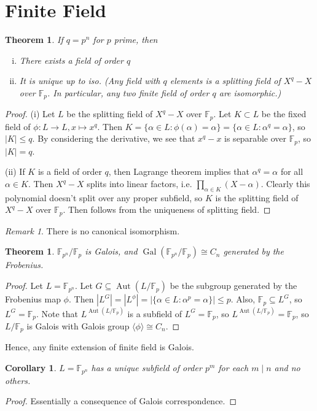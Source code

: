 \documentclass{article}
\theoremstyle{definition}
\theoremstyle{remark}
\newtheorem{rem}{Remark}
\theoremstyle{plain}
\newtheorem{thm}[defn]{Theorem}
\newtheorem{crly}[defn]{Corollary}
\newcommand{\FF}{\mathbb{F}}
\newcommand{\Aut}{\operatorname{Aut}}
\newcommand{\Gal}{\operatorname{Gal}}
\begin{document}
\section{Finite Field}
\begin{thm}
    If $q=p^n$ for $p$ prime, then \begin{enumerate}[(i)]
        \item There exists a field of order $q$
        \item It is unique up to iso. (Any field with $q$ elements is a splitting field of $X^q-X$ over $\FF_p$. In particular, any two finite field of order $q$ are isomorphic.)
    \end{enumerate}
\end{thm}
\begin{proof}
    (i) Let $L$ be the splitting field of $X^q-X$ over $\FF_p$. Let $K\subset L$ be the fixed field of $\phi:L\to L, x\mapsto x^q$. Then $K=\{\alpha\in L:\phi(\alpha)=\alpha\}=\{\alpha\in L:\alpha^q=\alpha\}$, so $|K|\le q$. By considering the derivative, we see that $x^q-x$ is separable over $\FF_p$, so $|K|=q$.

    (ii) If $K$ is a field of order $q$, then Lagrange theorem implies that $\alpha^q=\alpha$ for all $\alpha\in K$. Then $X^q-X$ splits into linear factors, i.e. $\prod_{\alpha\in K}(X-\alpha)$. Clearly this polynomial doesn't split over any proper subfield, so $K$ is the splitting field of $X^q-X$ over $\FF_p$. Then follows from the uniqueness of splitting field.
\end{proof}
\begin{rem}
    There is no canonical isomorphism.
\end{rem}
\begin{thm}
    $\FF_{p^n}/\FF_p$ is Galois, and $\Gal(\FF_{p^n}/\FF_p)\cong C_n$ generated by the Frobenius.
\end{thm}
\begin{proof}
    Let $L=\FF_{p^n}$. Let $G\subseteq\Aut(L/\FF_p)$ be the subgroup generated by the Frobenius map $\phi$. Then $|L^G|=|L^\phi|=|\{\alpha\in L:\alpha^p=\alpha\}|\le p$. Also, $\FF_p\subseteq L^G$, so $L^G=\FF_p$. Note that $L^{\Aut(L/\FF_p)}$ is a subfield of $L^G=\FF_p$, so $L^{\Aut(L/\FF_p)}=\FF_p$, so $L/\FF_p$ is Galois with Galois group $\langle\phi\rangle\cong C_n$.
\end{proof}
Hence, any finite extension of finite field is Galois.
\begin{crly}
    $L=\FF_{p^n}$ has a unique subfield of order $p^m$ for each $m\mid n$ and no others.
\end{crly}
\begin{proof}
    Essentially a consequence of Galois correspondence. 
\end{proof}
\end{document}
